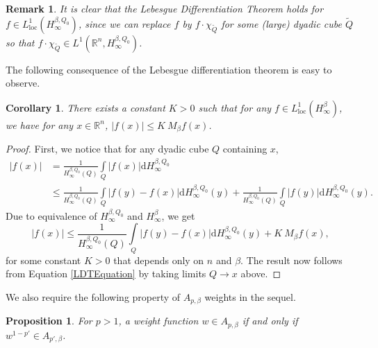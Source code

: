 \documentclass{amsart}
\newtheorem{corollary}[theorem]{Corollary}
\newtheorem{proposition}[theorem]{Proposition}
\newtheorem{remark}[theorem]{Remark}
\numberwithin{theorem}{section}
\numberwithin{equation}{section}
\begin{document}
		\begin{remark}
			\normalfont
			It is clear that the Lebesgue Differentiation Theorem holds for $f \in L^1_{\text{loc}} \left( H^{\beta, Q_0}_{\infty} \right)$, since we can replace $f$ by $f \cdot \chi_{\tilde{Q}}$ for some (large) dyadic cube $\tilde{Q}$ so that $f \cdot \chi_{\tilde{Q}} \in L^1 \left( \mathbb{R}^n, H^{\beta, Q_0}_{\infty} \right)$.
		\end{remark}
		The following consequence of the Lebesgue differentiation theorem is easy to observe.
		\begin{corollary}
			\label{LDTCor}
			There exists a constant $K > 0$ such that for any $f \in L^1_{\text{loc}} \left( H^{\beta}_{\infty} \right)$, we have for any $x \in \mathbb{R}^n$, $\left| f \left( x \right) \right| \leq K \ M_{\beta}f \left( x \right)$.
		\end{corollary}
		\begin{proof}
			First, we notice that for any dyadic cube $Q$ containing $x$,
			\begin{align*}
				\left| f \left( x \right) \right| &= \frac{1}{H^{\beta, Q_0}_{\infty} \left( Q \right)} \int\limits_{Q} \left| f \left( x \right) \right| \mathrm{d}H^{\beta, Q_0}_{\infty} \\
				&\leq \frac{1}{H^{\beta, Q_0}_{\infty} \left( Q \right)} \int\limits_{Q} \left| f \left( y \right) - f \left( x \right) \right| \mathrm{d}H^{\beta, Q_0}_{\infty} \left( y \right) + \frac{1}{H^{\beta, Q_0}_{\infty} \left( Q \right)} \int\limits_{Q} \left| f \left( y \right) \right| \mathrm{d}H^{\beta, Q_0}_{\infty} \left( y \right).
			\end{align*}
			Due to equivalence of $H^{\beta, Q_0}_{\infty}$ and $H^{\beta}_{\infty}$, we get
			$$\left| f \left( x \right) \right| \leq \frac{1}{H^{\beta, Q_0}_{\infty} \left( Q \right)} \int\limits_{Q} \left| f \left( y \right) - f \left( x \right) \right| \mathrm{d}H^{\beta, Q_0}_{\infty} \left( y \right) + K \ M_{\beta}f \left( x \right),$$
			for some constant $K > 0$ that depends only on $n$ and $\beta$. The result now follows from Equation \eqref{LDTEquation} by taking limits $Q \rightarrow x$ above.
		\end{proof}
		We also require the following property of $A_{p, \beta}$ weights in the sequel.
		\begin{proposition}
			\label{ApApPrimeCharacterization}
			For $p > 1$, a weight function $w \in A_{p, \beta}$ if and only if $w^{1 - p'} \in A_{p', \beta}$.
		\end{proposition}
\end{document}
